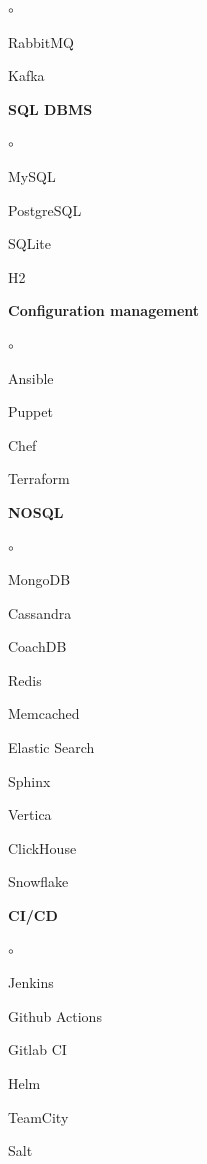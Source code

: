 \documentclass{cv}
\begin{document}
\begin{multicols}{3}
\begin {list}{\textbullet}{\itemsep=0mm}
\begin {list}{$\circ$}{}
          \item RabbitMQ
          \item Kafka
        \end{list}
      \item \textbf{SQL DBMS}
        \begin {list}{$\circ$}{}
          \item MySQL
          \item PostgreSQL
          \item SQLite
          \item H2
        \end{list}
      \item \textbf{Configuration management}
        \begin {list}{$\circ$}{}
          \item Ansible
          \item Puppet
          \item Chef
          \item Terraform
        \end{list}
      \columnbreak
      \item \textbf{NOSQL}
        \begin {list}{$\circ$}{}
          \item MongoDB
          \item Cassandra
          \item CoachDB
          \item Redis
          \item Memcached
          \item Elastic Search
          \item Sphinx
          \item Vertica
          \item ClickHouse
          \item Snowflake
        \end{list}
      \item \textbf{CI/CD}
        \begin {list}{$\circ$}{}
          \item Jenkins
          \item Github Actions
          \item Gitlab CI
          \item Helm
          \item TeamCity
          \item Salt
        \end{list}
    \end{list}
  \end{multicols}
\end{document}
